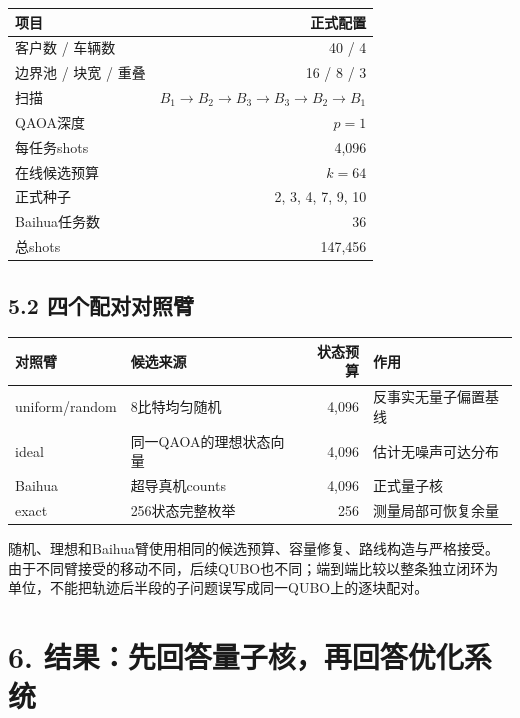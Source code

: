 \documentclass[
  10.5pt,
  UTF8]{ctexart}
\newcounter{none} %
\begin{document}
{\def\LTcaptype{none} %
\begin{longtable}[]{@{}lr@{}}
\toprule\noalign{}
项目 & 正式配置 \\
\midrule\noalign{}
\endhead
\bottomrule\noalign{}
\endlastfoot
客户数 / 车辆数 & 40 / 4 \\
边界池 / 块宽 / 重叠 & 16 / 8 / 3 \\
扫描 & \(B_1\to B_2\to B_3\to B_3\to B_2\to B_1\) \\
QAOA深度 & \(p=1\) \\
每任务shots & 4,096 \\
在线候选预算 & \(k=64\) \\
正式种子 & 2, 3, 4, 7, 9, 10 \\
Baihua任务数 & 36 \\
总shots & 147,456 \\
\end{longtable}
}

\subsection{5.2 四个配对对照臂}\label{ux56dbux4e2aux914dux5bf9ux5bf9ux7167ux81c2}

{\def\LTcaptype{none} %
\begin{longtable}[]{@{}llrl@{}}
\toprule\noalign{}
对照臂 & 候选来源 & 状态预算 & 作用 \\
\midrule\noalign{}
\endhead
\bottomrule\noalign{}
\endlastfoot
uniform/random & 8比特均匀随机 & 4,096 & 反事实无量子偏置基线 \\
ideal & 同一QAOA的理想状态向量 & 4,096 & 估计无噪声可达分布 \\
Baihua & 超导真机counts & 4,096 & 正式量子核 \\
exact & 256状态完整枚举 & 256 & 测量局部可恢复余量 \\
\end{longtable}
}

随机、理想和Baihua臂使用相同的候选预算、容量修复、路线构造与严格接受。由于不同臂接受的移动不同，后续QUBO也不同；端到端比较以整条独立闭环为单位，不能把轨迹后半段的子问题误写成同一QUBO上的逐块配对。

\section{6. 结果：先回答量子核，再回答优化系统}\label{ux7ed3ux679cux5148ux56deux7b54ux91cfux5b50ux6838ux518dux56deux7b54ux4f18ux5316ux7cfbux7edf}
\end{document}
